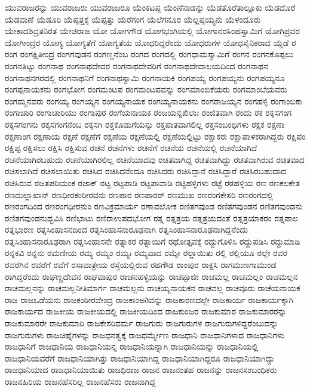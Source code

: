 {ಯುವರಾಜರನ್ನು
ಯುವರಾಜರು
ಯುವರಾಜರೂ
ಯೆಂಕಟಪ್ಪ
ಯೆಂಣೆನಾಡನ್ನು
ಯೆಡತೊರೆತಾಲ್ಲೂಕು
ಯೆಡದೊರೆ
ಯೆಡವಾಣೆ
ಯೆಡೂರಿ
ಯೆಪ್ಪತ್ತಕ್ಕೆ
ಯೆಪ್ಪತ್ತು
ಯೆರೆಗಂಗ
ಯೆಲೆಗನೂರ
ಯೆಲ್ಲಪ್ಪಯ್ಯನು
ಯೆಳಂದೂರು
ಯೇಕಾದಶಿವ್ರತನಿರತ
ಯೇಚಿರಾಜ
ಯೋ
ಯೋಗಗೌಡ
ಯೋಗಭಂಗಿಯಲ್ಲಿ
ಯೋಗಾನರಸಿಂಹಸ್ವಾಮಿಗೆ
ಯೋಗಿಪ್ರವರ
ಯೋಗೀಂದ್ರರ
ಯೋಗ್ಯ
ಯೋಗ್ಯತೆಗೆ
ಯೋಗ್ಯತೆಯ
ಯೋಧರಿದ್ದರೆಂದು
ಯೋಧರುಗಳ
ಯೋಧಸೈನಿಕರಾದ
ಯ್ದೆಡೆ
ರ
ರಂಗ
ರಂಗಕ್ಷಿತೀಂದ್ರ
ರಂಗಗವುಡನ
ರಂಗಣ್ಣನೆಂಬ
ರಂಗದ
ರಂಗದಲ್ಲಿ
ರಂಗಧಾಮಸ್ವಾಮಿಗೆ
ರಂಗನ
ರಂಗನಕೊಪ್ಪಲು
ರಂಗನತಿಟ್ಟು
ರಂಗನಾಥ
ರಂಗನಾಥದೇವರ
ರಂಗನಾಥದೇವರಿಗೆ
ರಂಗನಾಥದೇವಾಲಯದಿಂದ
ರಂಗನಾಥನ
ರಂಗನಾಥನಗರದಲ್ಲಿ
ರಂಗನಾಥನಿಗೆ
ರಂಗನಾಥಸ್ವಾಮಿ
ರಂಗನಾಯಕಿ
ರಂಗಪಯ್ಯ
ರಂಗಪಯ್ಯನು
ರಂಗಪಯ್ಯನೂ
ರಂಗಪ್ಪನಾಯಕನು
ರಂಗಭೋಗ
ರಂಗಮಂಟಪ
ರಂಗಮಂಟಪವನ್ನು
ರಂಗಮಾಂಬಿಕೆಯರು
ರಂಗಮಾಂಬೆಯವರು
ರಂಗಮ್ಮನವರು
ರಂಗಯ್ಯ
ರಂಗಯ್ಯನ
ರಂಗಯ್ಯನಾಯಕ
ರಂಗಯ್ಯನಾಯಕನು
ರಂಗರಾಜಯ್ಯನ
ರಂಗಹಳ್ಳಿ
ರಂಗಾಂಬಿಕಾ
ರಂಗಾಚಾರಿ
ರಂಗಾಚಾರಿಯು
ರಂಗಾಪುರ
ರಂಗೆಯನಾಯಕ
ರಂಜಯನ್ನಖಿಲಾಃ
ರಂಜಿತವಾಗಿ
ರಂದು
ರಕ
ರಕ್ಕಸಗಂಗ
ರಕ್ಕಸಗಂಗನು
ರಕ್ಕಸಗಂಗನೆಂಬ
ರಕ್ಕಸಗಿ
ರಕ್ತಕೊಡುಗೆಯನ್ನು
ರಕ್ತಪಾತವಾಗಲಿಲ್ಲ
ರಕ್ತಸಂಬಂಧಿಗಳು
ರಕ್ಷಕ
ರಕ್ಷಣಾ
ರಕ್ಷಣಾಂಗ
ರಕ್ಷಣಾಯ
ರಕ್ಷಣೆ
ರಕ್ಷಣೆಗೆ
ರಕ್ಷಣೆಯ
ರಕ್ಷಣೆಯಲ್ಲಿ
ರಕ್ಷಣೆಯಲ್ಲಿಟ್ಟು
ರಕ್ಷಾಕರಃ
ರಕ್ಷಾಪಾಳಕರಾಗಿದ್ದರು
ರಕ್ಷಿಪಂ
ರಕ್ಷಿಪ್ಪ
ರಕ್ಷಿಸಲು
ರಕ್ಷಿಸಿ
ರಕ್ಷಿಸುವ
ರಚನೆ
ರಚನೆಗಳು
ರಚನೆಗೆ
ರಚನೆಯ
ರಚನೆಯಲ್ಲಿ
ರಚನೆಯಾಗಿದೆ
ರಚನೆಯಾಗಿರಬಹುದು
ರಚನೆಯಾಗಿರಲಿಲ್ಲ
ರಚನೆಯಾದವು
ರಚಿತವಾಗಿದ್ದ
ರಚಿತವಾಗಿದ್ದು
ರಚಿತವಾಗಿರುವ
ರಚಿತವಾದ
ರಚಿಸಲಾಗಿದೆ
ರಚಿಸಲಾಯಿತು
ರಚಿಸಿದ
ರಚಿಸಿದನೆಂದೂ
ರಚಿಸಿದರು
ರಚಿಸಿದ್ದಾನೆ
ರಚಿಸಿದ್ದಾರೆ
ರಚಿಸಿರಬಹುದಾದ
ರಚಿಸಿರುವ
ರಜತಪರಿಯಂಕ
ರಜಾಕ್
ರಟ್ಟ
ರಟ್ಟಪಾಡಿ
ರಟ್ಟಪಾವಾಡಿ
ರಟ್ಟಿಹಳ್ಳಿಗಳು
ರಟ್ಟೆ
ರಠಹಳ್ಳಿಯ
ರಣ
ರಣಕಲಕೇತ
ರಣದುಲ್ಲಾಖಾನ್
ರಣಧೀರಕಂಠೀರವನು
ರಣಪಾರ
ರಣಪಾರರ್
ರಣಮುಖ
ರಣರಂಗಕೇಸರಿ
ರಣರಂಗದಲ್ಲಿ
ರಣರಂಗದಿಂದ
ರಣರಂಗಧೀರನುಂ
ರಣವಿಕ್ರಮಾರ್ಯ
ರಣಾವಲೋಕ
ರಣಿತಗವುಂಡ
ರಣಿತಗವುಂಡನ
ರಣಿತಗವುಂಡನು
ರಣಿತಗವುಂಡನುದ್ಭವಿಸಿ
ರಣಿಭಾಟು
ರಣಿರಾಉಪದಭೋಗ
ರತ್ನ
ರತ್ನತ್ರಯ
ರತ್ನತ್ರಯದಂತೆ
ರತ್ನತ್ರಯಾಕರಂ
ರತ್ನಪಾಲ
ರತ್ನಭಾರಣ
ರತ್ನಸಿಂಹಾಸನದಿಂದ
ರತ್ನಸಿಂಹಾಸನಾರೂಢನಾಗಿ
ರತ್ನಸಿಂಹಾಸನಾರೂಢನಾಗಿದ್ದನೆಂದು
ರತ್ನಸಿಂಹಾಸನಾರೂಢರಾಗಿ
ರತ್ನಸಿಂಹಾಸನೇ
ರತ್ನಾಕರ
ರತ್ನಾಯಿಗೆ
ರಥೋತ್ಸವಕ್ಕೆ
ರದ್ದುಗೊಳಿಸಿ
ರದ್ದುಪಡಿಸಿ
ರದ್ದುಮಾಡಿ
ರನ್ನಕವಿ
ರನ್ನನು
ರಮಣೀಯ
ರಮ್ಯ
ರಮ್ಯಂ
ರಮ್ಯಃ
ರಮ್ಯವಾದ
ರಮ್ಯೇ
ರಲ್ಲಾಯಿತು
ರಲ್ಲಿ
ರಲ್ಲಿಯೂ
ರಲ್ಲೇ
ರವರ
ರವರೆಗಿನ
ರವರೆಗೆ
ರವೆಗೆ
ರಸಾವಾತ್ರೇಯ
ರಸ್ತೆಯಲ್ಲಿರುವ
ರಹಗೌಡ
ರಾಂಪುರ
ರಾಕ್ಷಸಿ
ರಾಗಮುಣಗಾಮುಂಡ
ರಾಗಿದ್ದರೆಂದು
ರಾಘಣ್ಣದೇವನ
ರಾಘವಾಪುರ
ರಾಚನಹಳ್ಳಿಯನ್ನು
ರಾಚಪ್ಪಾಜೀ
ರಾಚಮಲ್ಲ
ರಾಚಮಲ್ಲಂ
ರಾಚಮಲ್ಲನ
ರಾಚಮಲ್ಲನನ್ನು
ರಾಚಮಲ್ಲನೀತಿಮಾರ್ಗ
ರಾಚಮಲ್ಲನು
ರಾಚಯ್ಯನಾಯಕನ
ರಾಚವಲ್ಲ
ರಾಚವೂರು
ರಾಚೆಯನಾಯಕ
ರಾಜ
ರಾಜಒಡೆಯನು
ರಾಜಕಂಠೀರವೇಂದ್ರ
ರಾಜಕಾಂಅðವನ್ನು
ರಾಜಕಾರಣದಲ್ಲೇ
ರಾಜಕಾರ್ಯ
ರಾಜಕಾರ್ಯಕ್ಕಾಗಿ
ರಾಜಕಾರ್ಯದ
ರಾಜಕೀಯ
ರಾಜಕೀಯದಲ್ಲಿ
ರಾಜಕೀಯದಿಂದ
ರಾಜಕುಂಜರ
ರಾಜಕುಮಾರ
ರಾಜಕುಮಾರರನ್ನು
ರಾಜಕುಮಾರರೇ
ರಾಜಕುಮಾರಿ
ರಾಜಕೇಸರಿವರ್ಮ
ರಾಜಗುರು
ರಾಜಗುರುಗಳ
ರಾಜಗುರುಗಳಿದ್ದರೆಂಬುದನ್ನು
ರಾಜಗುರುಗಳು
ರಾಜಚಿಹ್ನೆಗಳನ್ನು
ರಾಜಧನತ್ವಕ್ಕೆ
ರಾಜಧರ್ಮ್ಮೇಣ
ರಾಜಧಾನಿ
ರಾಜಧಾನಿಗಳಾದ
ರಾಜಧಾನಿಗಳು
ರಾಜಧಾನಿಗೆ
ರಾಜಧಾನಿಯ
ರಾಜಧಾನಿಯನ್ನ
ರಾಜಧಾನಿಯನ್ನಾಗಿ
ರಾಜಧಾನಿಯನ್ನು
ರಾಜಧಾನಿಯಲ್ಲಿ
ರಾಜಧಾನಿಯವರೆಗೆ
ರಾಜಧಾನಿಯಾಗಿತ್ತು
ರಾಜಧಾನಿಯಾಗಿದ್ದ
ರಾಜಧಾನಿಯಾಗಿದ್ದರೂ
ರಾಜಧಾನಿಯಾಗಿದ್ದು
ರಾಜಧಾನಿಯಾದ
ರಾಜಧಾನಿಯಾಯಿತು
ರಾಜಧಿರಾಜ
ರಾಜನ
ರಾಜನಂತಹ
ರಾಜನನ್ನು
ರಾಜನಸಂಬಂಧಿಕರು
ರಾಜನಹಿರಿಯ
ರಾಜನಹೆಸರಿಲ್ಲ
ರಾಜನಹೆಸರು
ರಾಜನಾಗಿದ್ದ
}
